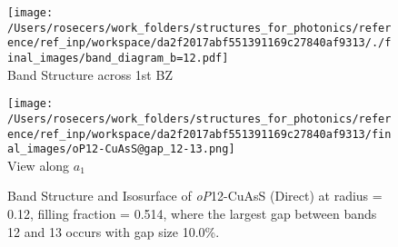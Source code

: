 \begin{figure}[H]
\begin{minipage}{0.5\textwidth}\centering
\texttt{[image: /Users/rosecers/work\_folders/structures\_for\_photonics/reference/ref\_inp/workspace/da2f2017abf551391169c27840af9313/./final\_images/band\_diagram\_b=12.pdf]}
\\Band Structure across 1st BZ
\end{minipage}\hfill
\begin{minipage}{0.48\textwidth}\centering
\texttt{[image: /Users/rosecers/work\_folders/structures\_for\_photonics/reference/ref\_inp/workspace/da2f2017abf551391169c27840af9313/final\_images/oP12-CuAsS@gap\_12-13.png]}
\\View along $a_1$ 
\end{minipage}\hfill\caption{Band Structure and Isosurface of \textit{oP}12-CuAsS (Direct) at radius = 0.12, filling fraction = 0.514, where the largest gap between bands 12 and 13 occurs with gap size 10.0\%.}

\end{figure}
\vspace{-0.25in}

